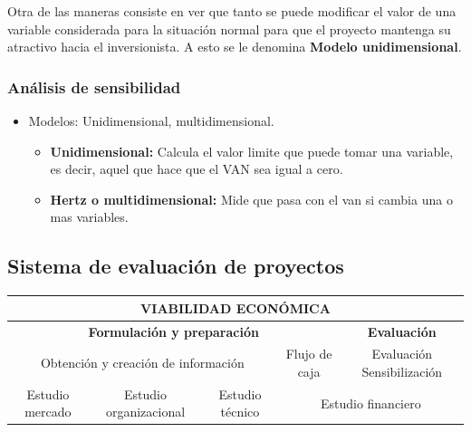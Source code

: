 \documentclass{templateNote}
\begin{document}
Otra de las maneras consiste en ver que tanto se puede modificar el valor de una variable considerada para la situación normal para que el proyecto mantenga su atractivo hacia el inversionista. A esto se le denomina \textbf{Modelo unidimensional}.

\subsubsection{Análisis de sensibilidad}
\begin{itemize}
    \item Modelos: Unidimensional, multidimensional.
    \begin{itemize}
        \item \textbf{Unidimensional:} Calcula el valor limite que puede tomar una variable, es decir, aquel que hace que el VAN sea igual a cero.
        \item \textbf{Hertz o multidimensional:} Mide que pasa con el van si cambia una o mas variables.
    \end{itemize}
\end{itemize}


\subsection{Sistema de evaluación de proyectos}

\begin{table}[H]
    \centering
    \renewcommand{\arraystretch}{1.5} %
    \begin{adjustbox}{max width=\textwidth}
        \begin{tabular}{|c|c|c|c|c|}
            \hline
            \multicolumn{5}{|c|}{\textbf{VIABILIDAD ECONÓMICA}} \\ \hline
            \multicolumn{4}{|c|}{\textbf{Formulación y preparación}} & \multicolumn{1}{c|}{\textbf{Evaluación}} \\ \hline
            \multicolumn{3}{|c|}{Obtención y creación de información} & {Flujo de caja} & {Evaluación Sensibilización} \\ \hline
            {Estudio mercado} & {Estudio organizacional} & {Estudio técnico} & \multicolumn{2}{c|}{Estudio financiero} \\ \hline
        \end{tabular}
    \end{adjustbox}
\end{table}
\end{document}
